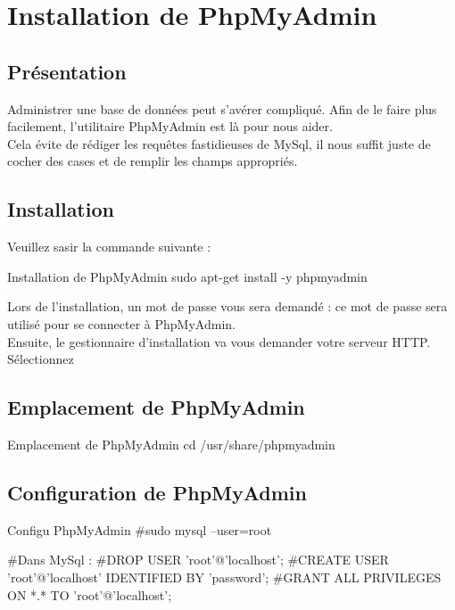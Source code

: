 \chapter{Installation de PhpMyAdmin}

\section{Présentation}
Administrer une base de données peut s'avérer compliqué. Afin de le faire plus facilement, l'utilitaire PhpMyAdmin est là pour nous aider. \\
Cela évite de rédiger les requêtes fastidieuses de MySql, il nous suffit juste de cocher des cases et de remplir les champs appropriés. \\
\section{Installation}
Veuillez sasir la commande suivante : 
\begin{Bash}{Installation de PhpMyAdmin}
sudo apt-get install -y phpmyadmin
\end{Bash}

Lors de l’installation, un mot de passe vous sera demandé : ce mot de passe sera utilisé pour se connecter à PhpMyAdmin. \\

Ensuite, le gestionnaire d’installation va vous demander votre serveur HTTP.
Sélectionnez 

\section{Emplacement de PhpMyAdmin}

\begin{Bash}{Emplacement de PhpMyAdmin}
cd /usr/share/phpmyadmin
\end{Bash}


\section{Configuration de PhpMyAdmin}

\begin{Bash}{Configu PhpMyAdmin}
#sudo mysql --user=root

#Dans MySql :
#DROP USER 'root'@'localhost';
#CREATE USER 'root'@'localhost' IDENTIFIED BY 'password';
#GRANT ALL PRIVILEGES ON *.* TO 'root'@'localhost';


\end{Bash}


